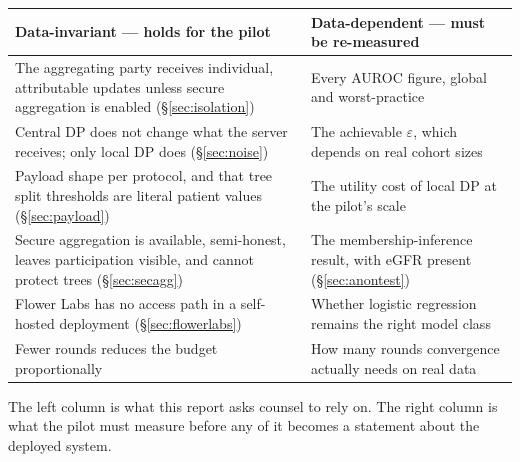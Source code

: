 \begin{center}
\small
\begin{tabular}{p{6.6cm}p{6.6cm}}
  \toprule
  \textbf{Data-invariant --- holds for the pilot} & \textbf{Data-dependent --- must be re-measured} \\
  \midrule
  The aggregating party receives individual, attributable updates unless secure aggregation is
  enabled (\S\ref{sec:isolation})
  & Every AUROC figure, global and worst-practice \\
  \addlinespace
  Central DP does not change what the server receives; only local DP does (\S\ref{sec:noise})
  & The achievable $\varepsilon$, which depends on real cohort sizes \\
  \addlinespace
  Payload shape per protocol, and that tree split thresholds are literal patient values
  (\S\ref{sec:payload})
  & The utility cost of local DP at the pilot's scale \\
  \addlinespace
  Secure aggregation is available, semi-honest, leaves participation visible, and cannot protect
  trees (\S\ref{sec:secagg})
  & The membership-inference result, with eGFR present (\S\ref{sec:anontest}) \\
  \addlinespace
  Flower Labs has no access path in a self-hosted deployment (\S\ref{sec:flowerlabs})
  & Whether logistic regression remains the right model class \\
  \addlinespace
  Fewer rounds reduces the budget proportionally
  & How many rounds convergence actually needs on real data \\
  \bottomrule
\end{tabular}
\end{center}

The left column is what this report asks counsel to rely on. The right column is what the pilot must
measure before any of it becomes a statement about the deployed system.
